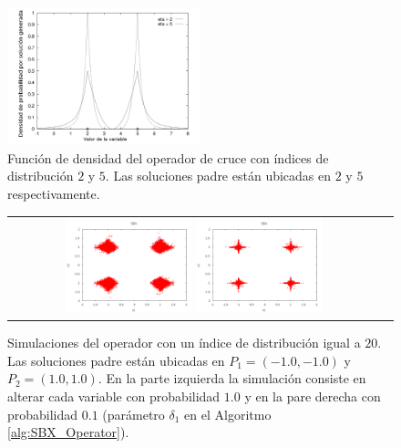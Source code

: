 \begin{figure}[!t]
\centering
\includegraphics[width=0.5\textwidth]{img/Operadores/DensitySBX.png} 
\caption{Función de densidad del operador de cruce \SBX{} con índices de distribución $2$ y $5$. Las soluciones padre están ubicadas en $2$ y $5$ respectivamente.}
\label{fig:fig_sim}
\end{figure}

\begin{figure}[!t]
\centering
\begin{tabular}{cc}
   \includegraphics[width=0.35\textwidth]{img/Operadores/SBX_eta_20_2D_pv_1.png} 
   \includegraphics[width=0.35\textwidth]{img/Operadores/SBX_eta_20_2D_pv_01.png} 
\end{tabular}
\caption{Simulaciones del operador \SBX{} con un índice de distribución igual a $20$. Las soluciones padre están ubicadas en $P_1=(-1.0, -1.0)$ y $P_2=(1.0, 1.0)$. En la parte izquierda la simulación consiste en alterar cada variable con probabilidad $1.0$ y en la pare derecha con probabilidad $0.1$ (parámetro $\delta_1$ en el Algoritmo \ref{alg:SBX_Operator}).}
\label{fig:Simulation_pv}
\end{figure}



